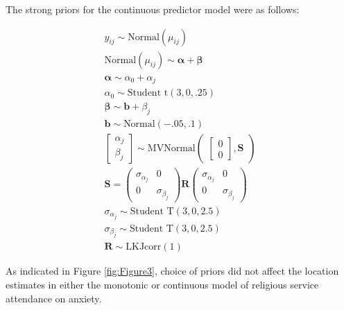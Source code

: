\documentclass[]{interact}
\theoremstyle{plain}%
\theoremstyle{definition}
\theoremstyle{remark}
\begin{document}
The strong priors for the continuous predictor model were as follows: 


$$
\begin{aligned}
y_{ij} \sim \text{Normal}(\mu_{ij}) \nonumber\\
\text{Normal}(\mu_{ij})\sim \boldsymbol{\alpha +\beta} \nonumber\\
\boldsymbol{\alpha} \sim \alpha_{0} +\alpha_j \nonumber\\
\alpha_{0} \sim \text{Student~t}(3, 0,.25)\nonumber\\
\boldsymbol{\beta}\sim \boldsymbol{b} + \beta_j \nonumber\\
\boldsymbol{b}\sim\text{Normal}(-.05,.1) \nonumber\\
\begin{bmatrix}
\alpha_j \\
\beta_j
\end{bmatrix}
\sim 
\text{MVNormal}
\begin{pmatrix}
\begin{bmatrix}
0\\
0
\end{bmatrix}
,\boldsymbol{S} \nonumber
\end{pmatrix}\\
\boldsymbol{S} = 
\begin{pmatrix}
\sigma_{\alpha_j} & 0 \\
0 & \sigma_{\beta_j} \nonumber
\end{pmatrix} \boldsymbol{R} \begin{pmatrix}
\sigma_{\alpha_j} & 0 \\
0 & \sigma_{\beta_j} \nonumber
\end{pmatrix}\\
\sigma_{\alpha_j} \sim
\text{Student~T}(3,0,2.5) \nonumber\\
\sigma_{\beta_j} \sim 
\text{Student~T}(3,0,2.5)  \nonumber\\
\boldsymbol{R}\sim \text{LKJcorr}(1) \nonumber
\end{aligned}
$$


As indicated in Figure \ref{fig:Figure3}, choice of priors did not affect the location estimates in either the monotonic or continuous model of religious service attendance on anxiety. 
\end{document}
